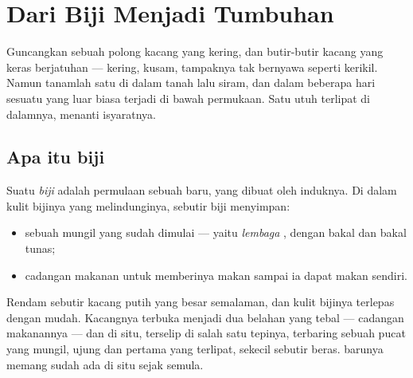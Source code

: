 \chapter{Dari Biji Menjadi Tumbuhan}\label{ch:g2:from-seed-to-plant}

Guncangkan sebuah polong kacang yang kering, dan butir-butir kacang
yang keras berjatuhan --- kering, kusam, tampaknya tak bernyawa
seperti kerikil. Namun tanamlah satu di dalam tanah lalu siram, dan
dalam beberapa hari sesuatu yang luar biasa terjadi di bawah
permukaan. Satu  utuh terlipat di dalamnya, menanti isyaratnya.

\section{Apa itu biji}

\begin{definition}[Biji]\label{def:g2:from-seed-to-plant:seed}
Suatu \emph{biji} adalah permulaan sebuah  baru,
yang dibuat oleh  induknya. Di dalam kulit bijinya yang melindunginya,
sebutir biji menyimpan:
\begin{itemize}
  \item sebuah  mungil yang sudah dimulai --- yaitu
        \emph{lembaga} , dengan bakal 
        dan bakal tunas;
  \item cadangan makanan untuk memberinya makan sampai ia dapat makan
        sendiri.
\end{itemize}
\end{definition}

\begin{example}\label{ex:g2:from-seed-to-plant:open}
Rendam sebutir kacang putih yang besar semalaman, dan kulit bijinya
terlepas dengan mudah. Kacangnya terbuka menjadi dua belahan yang
tebal --- cadangan makanannya --- dan di situ, terselip di salah satu
tepinya, terbaring sebuah  pucat yang mungil, ujung  dan
 pertama yang terlipat, sekecil sebutir beras.  barunya
memang sudah ada di situ sejak semula.
\end{example}

